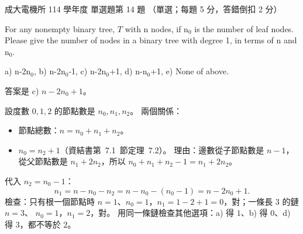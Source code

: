 \begin{pastexam}[label={px:ncku-114-ee-ds-14}]{成大電機所 114 學年度 單選題第 14 題}
（單選；每題 5 分，答錯倒扣 2 分）

For any nonempty binary tree, $T$ with n nodes, if n$_0$ is the number of leaf nodes. Please give
the number of nodes in a binary tree with degree 1, in terms of n and n$_0$.

a) n-2n$_0$, \quad b) n-2n$_0$-1, \quad c) n-2n$_0$+1, \quad d) n-n$_0$+1, \quad e) None of above.
\end{pastexam}

\begin{pastsoln}
答案是 c) $n - 2n_0 + 1$。

設度數 $0, 1, 2$ 的節點數是 $n_0, n_1, n_2$。 兩個關係：
\begin{itemize}
\item 節點總數：$n = n_0 + n_1 + n_2$。
\item $n_0 = n_2 + 1$（資結書第~7.1~節定理~7.2）。 理由：邊數從子節點數是 $n - 1$，從父節點數是
$n_1 + 2n_2$，所以 $n_0 + n_1 + n_2 - 1 = n_1 + 2n_2$。
\end{itemize}
代入 $n_2 = n_0 - 1$：
\[
n_1 = n - n_0 - n_2 = n - n_0 - (n_0 - 1) = n - 2n_0 + 1.
\]
檢查：只有根一個節點時 $n = 1$、$n_0 = 1$，$n_1 = 1 - 2 + 1 = 0$，對；一條長 $3$ 的鏈 $n = 3$、
$n_0 = 1$，$n_1 = 2$，對。 用同一條鏈檢查其他選項：a) 得 $1$、b) 得 $0$、d) 得 $3$，都不等於 $2$。
\end{pastsoln}
